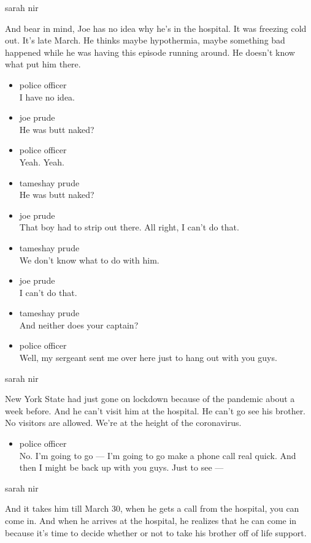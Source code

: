 sarah nir

And bear in mind, Joe has no idea why he's in the hospital. It was
freezing cold out. It's late March. He thinks maybe hypothermia, maybe
something bad happened while he was having this episode running around.
He doesn't know what put him there.

\begin{itemize}
\item
  police officer\\
  I have no idea.
\item
  joe prude\\
  He was butt naked?
\item
  police officer\\
  Yeah. Yeah.
\item
  tameshay prude\\
  He was butt naked?
\item
  joe prude\\
  That boy had to strip out there. All right, I can't do that.
\item
  tameshay prude\\
  We don't know what to do with him.
\item
  joe prude\\
  I can't do that.
\item
  tameshay prude\\
  And neither does your captain?
\item
  police officer\\
  Well, my sergeant sent me over here just to hang out with you guys.
\end{itemize}

sarah nir

New York State had just gone on lockdown because of the pandemic about a
week before. And he can't visit him at the hospital. He can't go see his
brother. No visitors are allowed. We're at the height of the
coronavirus.

\begin{itemize}
\tightlist
\item
  police officer\\
  No. I'm going to go --- I'm going to go make a phone call real quick.
  And then I might be back up with you guys. Just to see ---
\end{itemize}

sarah nir

And it takes him till March 30, when he gets a call from the hospital,
you can come in. And when he arrives at the hospital, he realizes that
he can come in because it's time to decide whether or not to take his
brother off of life support.

